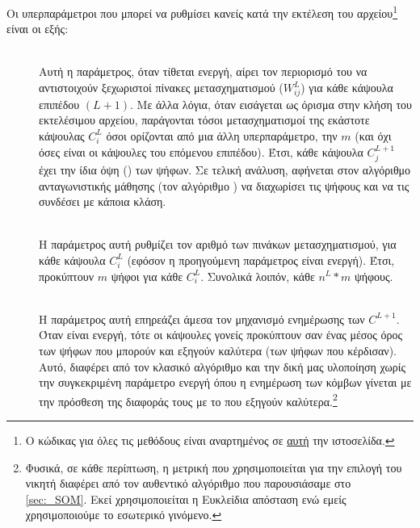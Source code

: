 Οι υπερπαράμετροι που μπορεί να ρυθμίσει κανείς κατά την εκτέλεση του αρχείου\footnote{Ο κώδικας για όλες τις μεθόδους είναι αναρτημένος σε \href{https://github.com/abarmper/Capsule_Nets_with_uncertainty}{αυτή} την ιστοσελίδα.} είναι οι εξής:
\begin{description}
  \item[]\hfill \\
  Αυτή η παράμετρος, όταν τίθεται ενεργή, αίρει τον περιορισμό του να αντιστοιχούν ξεχωριστοί πίνακες μετασχηματισμού ($W_{ij}^L$) για κάθε κάψουλα επιπέδου $(L+1)$. Με άλλα λόγια, όταν εισάγεται ως όρισμα στην κλήση του εκτελέσιμου αρχείου, παράγονται τόσοι μετασχηματισμοί της εκάστοτε κάψουλας $C_i^L$ όσοι ορίζονται από μια άλλη υπερπαράμετρο, την $m$ (και όχι όσες είναι οι κάψουλες του επόμενου επιπέδου). Έτσι, κάθε κάψουλα $C^{L+1}_j$ έχει την ίδια όψη () των ψήφων. Σε τελική ανάλυση, αφήνεται στον αλγόριθμο ανταγωνιστικής μάθησης (τον αλγόριθμο ) να διαχωρίσει τις ψήφους και να τις συνδέσει με κάποια κλάση.
  
  \item[] \hfill \\
  Η παράμετρος αυτή ρυθμίζει τον αριθμό των πινάκων μετασχηματισμού, για κάθε κάψουλα $C_i^L$ (εφόσον η προηγούμενη παράμετρος είναι ενεργή). Έτσι, προκύπτουν $m$ ψήφοι για κάθε $C_i^L$. Συνολικά λοιπόν, κάθε   $n^L \ast m$ ψήφους.
  
  \item[] \hfill \\
  Η παράμετρος αυτή επηρεάζει άμεσα τον μηχανισμό ενημέρωσης των $C^{L+1}$. Όταν είναι ενεργή, τότε οι κάψουλες γονείς προκύπτουν σαν ένας μέσος όρος των ψήφων που μπορούν και εξηγούν καλύτερα (των ψήφων που κέρδισαν). Αυτό, διαφέρει από τον κλασικό αλγόριθμο  και την δική μας υλοποίηση χωρίς την συγκεκριμένη παράμετρο ενεργή όπου η ενημέρωση των κόμβων γίνεται με την πρόσθεση της διαφοράς τους με το  που εξηγούν καλύτερα.\footnote{Φυσικά, σε κάθε περίπτωση, η μετρική που χρησιμοποιείται για την επιλογή του νικητή διαφέρει από τον αυθεντικό αλγόριθμο που παρουσιάσαμε στο \ref{sec:_SOM}. Εκεί χρησιμοποιείται η Ευκλείδια απόσταση ενώ εμείς χρησιμοποιούμε το εσωτερικό γινόμενο.}
  

\end{description}
